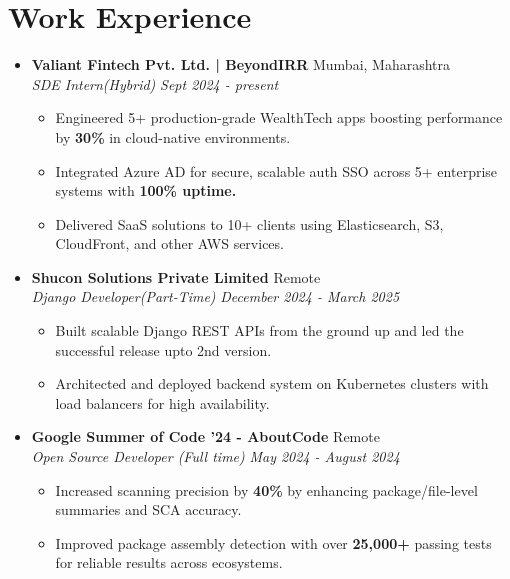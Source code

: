 \documentclass[7pt, legalpaper]{article}
\begin{document}
\section{Work Experience}
\begin{itemize}[leftmargin=*]

\item \textbf{Valiant Fintech Pvt. Ltd. | BeyondIRR}  \hfill {Mumbai, Maharashtra} \\
\textit{SDE Intern(Hybrid)}  \hfill \textit{Sept 2024 - present}
\begin{itemize}[label=$\diamond$]
    \item Engineered 5+ production-grade WealthTech apps boosting performance by \textbf{30\%} in cloud-native environments.
    \item Integrated Azure AD for secure, scalable auth SSO across 5+ enterprise systems with \textbf{100\% uptime.}
    \item Delivered SaaS solutions to 10+ clients using Elasticsearch, S3, CloudFront, and other AWS services.

\end{itemize}

\item \textbf{Shucon Solutions Private Limited}  \hfill {Remote} \\
\textit{Django Developer(Part-Time)}  \hfill \textit{December 2024 - March 2025}
\begin{itemize}[label=$\diamond$]
    \item Built scalable Django REST APIs from the ground up and led the successful release upto 2nd version. 
    \item Architected and deployed backend system on Kubernetes clusters with load balancers for high availability.
\end{itemize}

\item \textbf{Google Summer of Code '24 - AboutCode}  \hfill {Remote} \\
\textit{Open Source Developer (Full time)}  \hfill \textit{May 2024 - August 2024}
\begin{itemize}[label=$\diamond$]
    \item  Increased scanning precision by \textbf{40\%} by enhancing package/file-level summaries and SCA accuracy.
    \item Improved package assembly detection with over \textbf{25,000+} passing tests for reliable results across ecosystems.


\end{itemize}
\end{itemize}
\end{document}

